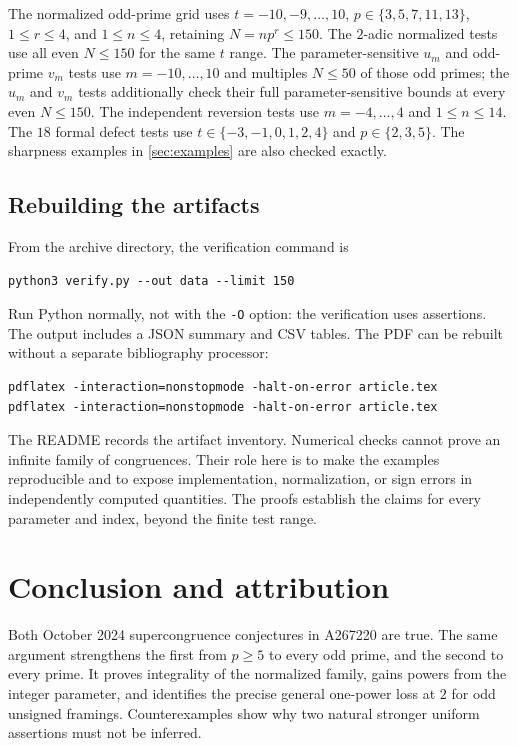 \documentclass[11pt,letterpaper]{article}
\numberwithin{equation}{section}
\theoremstyle{definition}
\theoremstyle{remark}
\begin{document}
The normalized odd-prime grid uses $t=-10,-9,\ldots,10$,
$p\in\{3,5,7,11,13\}$, $1\le r\le4$, and $1\le n\le4$, retaining
$N=np^r\le150$. The $2$-adic normalized tests use all even $N\le150$
for the same $t$ range. The parameter-sensitive $u_m$ and odd-prime
$v_m$ tests use $m=-10,\ldots,10$ and multiples $N\le50$ of those odd
primes; the $u_m$ and $v_m$ tests additionally check their full
parameter-sensitive bounds at every even $N\le150$.
The independent reversion tests use $m=-4,\ldots,4$ and $1\le n\le14$.
The $18$ formal defect tests use
$t\in\{-3,-1,0,1,2,4\}$ and $p\in\{2,3,5\}$.
The sharpness examples in \cref{sec:examples} are also checked exactly.

\subsection{Rebuilding the artifacts}
From the archive directory, the verification command is
\begin{verbatim}
python3 verify.py --out data --limit 150
\end{verbatim}
Run Python normally, not with the \texttt{-O} option: the verification
uses assertions. The output includes a JSON summary and CSV tables.
The PDF can be rebuilt without a separate bibliography processor:
\begin{verbatim}
pdflatex -interaction=nonstopmode -halt-on-error article.tex
pdflatex -interaction=nonstopmode -halt-on-error article.tex
\end{verbatim}
The README records the artifact inventory. Numerical checks cannot prove
an infinite family of congruences. Their role here is to make the examples
reproducible and to expose implementation, normalization, or sign errors
in independently computed quantities. The proofs establish the claims
for every parameter and index, beyond the finite test range.

\section{Conclusion and attribution}\label{sec:conclusion}
Both October 2024 supercongruence conjectures in A267220 are true. The
same argument strengthens the first from $p\ge5$ to every odd prime,
and the second to every prime. It proves integrality of the normalized
family, gains powers from the integer parameter, and identifies the
precise general one-power loss at $2$ for odd unsigned framings.
Counterexamples show why two natural stronger uniform assertions must
not be inferred.
\end{document}
